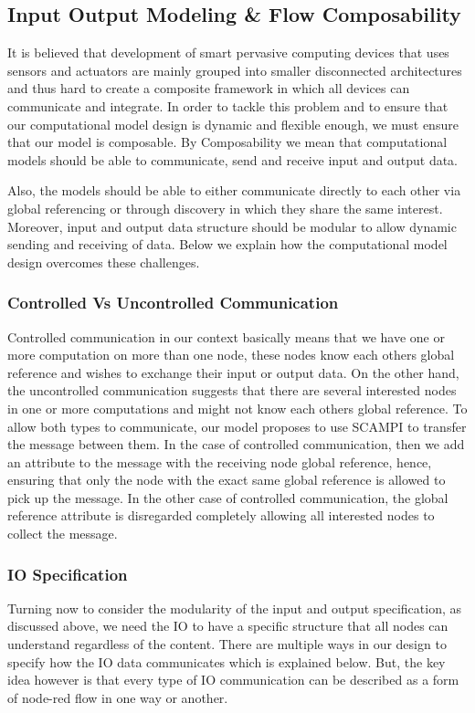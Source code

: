 \subsection{Input Output Modeling \& Flow Composability}
It is believed that development of smart pervasive computing devices that uses sensors and actuators are mainly grouped into smaller disconnected architectures and thus hard to create a composite framework in which all devices can communicate and integrate\cite{5470524}. In order to tackle this problem and to ensure that our computational model design is dynamic and flexible enough, we must ensure that our model is composable. By Composability we mean that computational models should be able to communicate, send and receive input and output data. 

Also, the models should be able to either communicate directly to each other via global referencing or through discovery in which they share the same interest. Moreover, input and output data structure should be modular to allow dynamic sending and receiving of data. Below we explain how the computational model design overcomes these challenges. 

\subsubsection{Controlled Vs Uncontrolled Communication}
Controlled communication in our context basically means that we have one or more computation on more than one node, these nodes know each others global reference and wishes to exchange their input or output data. On the other hand, the uncontrolled communication suggests that there are several interested nodes in one or more computations and might not know each others global reference.
To allow both types to communicate, our model proposes to use SCAMPI to transfer the message between them. In the case of controlled communication, then we add an attribute to the message with the receiving node global reference, hence, ensuring that only the node with the exact same global reference is allowed to pick up the message. In the other case of controlled communication, the global reference attribute is disregarded completely allowing all interested nodes to collect the message.

\newpage
\subsubsection{IO Specification}
Turning now to consider the modularity of the input and output specification, as discussed above, we need the IO to have a specific structure that all nodes can understand regardless of the content. There are multiple ways in our design to specify how the IO data communicates which is explained below. But, the key idea however is that every type of IO communication can be described as a form of node-red flow in one way or another.

